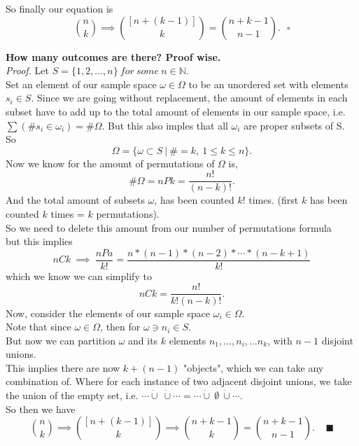 \documentclass[12pt]{book}
\begin{document}
So finally our equation is 
$$ {n \choose k} \implies {[n + (k-1)] \choose k} = {n+k-1 \choose n-1}.~~~\square$$

\noindent \textbf{How many outcomes are there? Proof wise.}\\
\textit{Proof.}
Let $S=\{1,2,...,n\}~for~some~n\in \mathbb{N}$.\\
Set an element of our sample space $\omega \in \Omega$ to be an unordered set with elements $s_i\in S$. Since we are going without replacement, the amount of elements in each subset have to add up to the total amount of elements in our sample space, i.e. $\sum (\#s_i \in  \omega _i) = \#\Omega$. But this also imples that all $\omega_i$ are proper subsets of S. \\
So $$\Omega = \big\{  \omega \subset S ~\big|~ \# = k,~1\leq k \leq n  \big\}.$$
Now we know for the amount of permutations of $\Omega$ is,
$$ \#\Omega = nPk = \frac{n!}{(n-k)!}.$$
And the total amount of subsets $\omega$, has been counted $k!$ times. (first $k$ has been counted $k$ times = $k$ permutations). \\
So we need to delete this amount from our number of permutations formula\\
but this implies\\
$$nCk ~\implies{}~ \frac{nPa}{k!} = \frac{n*(n-1)*(n-2)* \cdots *(n-k+1)}{k!}$$
which we know we can simplify to
$$nCk = \frac{n!}{k!(n-k)!}.$$
Now, consider the elements of our sample space $\omega_i \in \Omega$.\\
Note that since $\omega\in \Omega$, then for $\omega \ni n_i \in S$.\\
But now we can partition $\omega$ and its $k$ elements $n_1,...,n_i,...n_k$, with $n-1$ disjoint unions.\\
This implies there are now $k + (n-1)$ "objects", which we can take any combination of. Where for each instance of two adjacent disjoint unions, we take the union of the empty set, i.e. $\cdots \dot{\cup}~\dot{\cup} \cdots = \cdots \dot{\cup}~\emptyset~\dot{\cup} \cdots.$\\
So then we have \\
$${n \choose k} \implies {[n + (k-1)] \choose k} \implies {n + k-1 \choose k}= {n+k-1 \choose n-1}. ~~~~~\blacksquare$$
\end{document}

